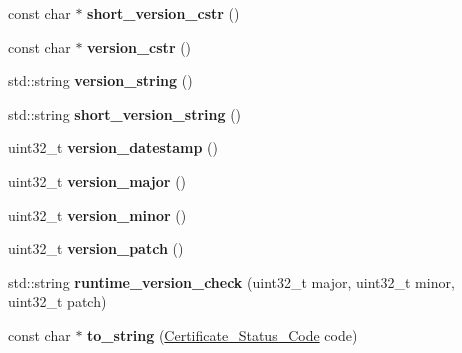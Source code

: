 \begin{DoxyCompactItemize}
\item 
\mbox{\label{namespace_botan_afd0321566cb255f655d8d196cdc547c8}} 
const char $\ast$ {\bfseries short\+\_\+version\+\_\+cstr} ()
\item 
\mbox{\label{namespace_botan_af76f5efd521654961c45ff6d676a2608}} 
const char $\ast$ {\bfseries version\+\_\+cstr} ()
\item 
\mbox{\label{namespace_botan_a214423710ee97e9eaa5b2260356995b6}} 
std\+::string {\bfseries version\+\_\+string} ()
\item 
\mbox{\label{namespace_botan_a86c2cef7dc1d6a5d05dfc8b4e68efcc3}} 
std\+::string {\bfseries short\+\_\+version\+\_\+string} ()
\item 
\mbox{\label{namespace_botan_a6667e739f26d272b330e17c8023e8913}} 
uint32\+\_\+t {\bfseries version\+\_\+datestamp} ()
\item 
\mbox{\label{namespace_botan_a4c2a4f21fc240907844e0f10643c496c}} 
uint32\+\_\+t {\bfseries version\+\_\+major} ()
\item 
\mbox{\label{namespace_botan_a157480114501d38de19e9266002806fc}} 
uint32\+\_\+t {\bfseries version\+\_\+minor} ()
\item 
\mbox{\label{namespace_botan_a82b0472a86fe8d3228073bac60050fbf}} 
uint32\+\_\+t {\bfseries version\+\_\+patch} ()
\item 
\mbox{\label{namespace_botan_abbb7d85a37397c79756994a32b1bc1c7}} 
std\+::string {\bfseries runtime\+\_\+version\+\_\+check} (uint32\+\_\+t major, uint32\+\_\+t minor, uint32\+\_\+t patch)
\item 
\mbox{\label{namespace_botan_a06ff2944d16eb3bbc4d99b15b6b78535}} 
const char $\ast$ {\bfseries to\+\_\+string} (\mbox{\hyperlink{namespace_botan_ae1e907dc90937bdda30f65216e68ff2b}{Certificate\+\_\+\+Status\+\_\+\+Code}} code)
\item 
\mbox{\label{namespace_botan_a5301bd6dfea11cd549515c147ce4c5b8}} 

\end{DoxyCompactItemize}
